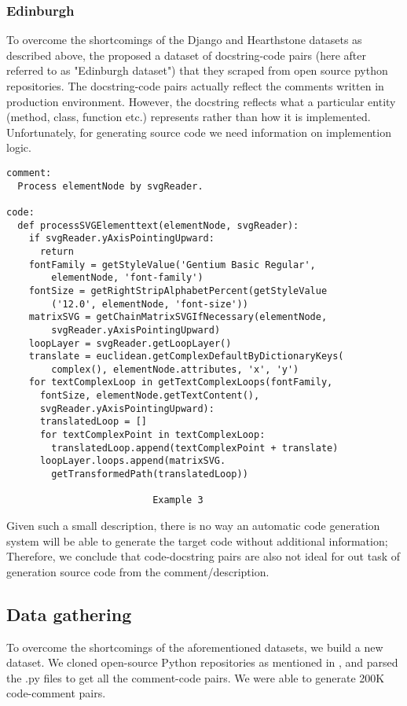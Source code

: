 \documentclass{IEEEtran}
\begin{document}
      \subsubsection{Edinburgh}
        To overcome the shortcomings of the Django and Hearthstone datasets as
        described above, the \cite{barone2017} proposed a dataset of
        docstring-code pairs (here after referred to as "Edinburgh dataset") that 
        they scraped from open source python repositories. The docstring-code   
        pairs actually reflect the comments written in production environment. However,
        the docstring reflects what a particular entity (method, class, function etc.)
        represents rather than how it is implemented. Unfortunately, for generating
        source code we need information on implemention logic. \\
      \begin{lstlisting}[frame=single,basicstyle=\scriptsize]
comment:
  Process elementNode by svgReader.

code:
  def processSVGElementtext(elementNode, svgReader):
    if svgReader.yAxisPointingUpward:
      return
    fontFamily = getStyleValue('Gentium Basic Regular', 
        elementNode, 'font-family')
    fontSize = getRightStripAlphabetPercent(getStyleValue
        ('12.0', elementNode, 'font-size'))
    matrixSVG = getChainMatrixSVGIfNecessary(elementNode, 
        svgReader.yAxisPointingUpward)
    loopLayer = svgReader.getLoopLayer()
    translate = euclidean.getComplexDefaultByDictionaryKeys(
        complex(), elementNode.attributes, 'x', 'y')
    for textComplexLoop in getTextComplexLoops(fontFamily, 
      fontSize, elementNode.getTextContent(), 
      svgReader.yAxisPointingUpward):
      translatedLoop = []
      for textComplexPoint in textComplexLoop:
        translatedLoop.append(textComplexPoint + translate)
      loopLayer.loops.append(matrixSVG.
        getTransformedPath(translatedLoop))

                          Example 3
      \end{lstlisting}

      Given such a small description, there is no way an automatic code
      generation system will be able to generate the target code without
      additional information; Therefore, we conclude that code-docstring
      pairs are also not ideal for out task of generation source code from the
      comment/description.

      \subsection{Data gathering}
        To overcome the shortcomings of the aforementioned datasets, we build a new
        dataset. We cloned open-source Python repositories as mentioned in \cite{barone2017},
        and parsed the .py files to get all the comment-code pairs. We
        were able to generate 200K code-comment pairs.
\end{document}

